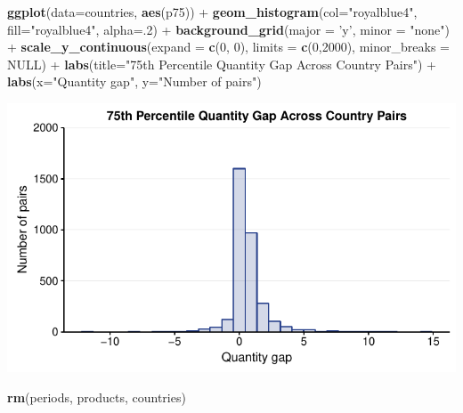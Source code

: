 \documentclass[10pt,]{article}
\newenvironment{Shaded}{\begin{snugshade}}{\end{snugshade}}
\newcommand{\KeywordTok}[1]{\textcolor[rgb]{0.13,0.29,0.53}{\textbf{{#1}}}}
\newcommand{\DataTypeTok}[1]{\textcolor[rgb]{0.13,0.29,0.53}{{#1}}}
\newcommand{\DecValTok}[1]{\textcolor[rgb]{0.00,0.00,0.81}{{#1}}}
\newcommand{\StringTok}[1]{\textcolor[rgb]{0.31,0.60,0.02}{{#1}}}
\newcommand{\OtherTok}[1]{\textcolor[rgb]{0.56,0.35,0.01}{{#1}}}
\newcommand{\NormalTok}[1]{{#1}}
\begin{document}
\begin{Shaded}
\begin{Highlighting}[]
\KeywordTok{ggplot}\NormalTok{(}\DataTypeTok{data=}\NormalTok{countries, }\KeywordTok{aes}\NormalTok{(p75)) +}
\StringTok{  }\KeywordTok{geom_histogram}\NormalTok{(}\DataTypeTok{col=}\StringTok{"royalblue4"}\NormalTok{,}
                 \DataTypeTok{fill=}\StringTok{"royalblue4"}\NormalTok{,}
                 \DataTypeTok{alpha=}\NormalTok{.}\DecValTok{2}\NormalTok{) +}
\StringTok{  }\KeywordTok{background_grid}\NormalTok{(}\DataTypeTok{major =} \StringTok{'y'}\NormalTok{, }\DataTypeTok{minor =} \StringTok{"none"}\NormalTok{) +}
\StringTok{  }\KeywordTok{scale_y_continuous}\NormalTok{(}\DataTypeTok{expand =} \KeywordTok{c}\NormalTok{(}\DecValTok{0}\NormalTok{, }\DecValTok{0}\NormalTok{), }\DataTypeTok{limits =} \KeywordTok{c}\NormalTok{(}\DecValTok{0}\NormalTok{,}\DecValTok{2000}\NormalTok{), }\DataTypeTok{minor_breaks =} \OtherTok{NULL}\NormalTok{) +}
\StringTok{  }\KeywordTok{labs}\NormalTok{(}\DataTypeTok{title=}\StringTok{"75th Percentile Quantity Gap Across Country Pairs"}\NormalTok{) +}
\StringTok{  }\KeywordTok{labs}\NormalTok{(}\DataTypeTok{x=}\StringTok{"Quantity gap"}\NormalTok{, }\DataTypeTok{y=}\StringTok{"Number of pairs"}\NormalTok{)}
\end{Highlighting}
\end{Shaded}

\begin{center}\includegraphics{Figs/quantity_pairs-4} \end{center}

\begin{Shaded}
\begin{Highlighting}[]
\KeywordTok{rm}\NormalTok{(periods, products, countries)}
\end{Highlighting}
\end{Shaded}
\end{document}
